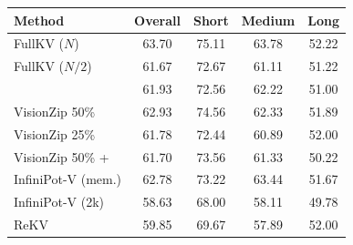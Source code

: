 \begin{tabular}{l|cccc}
\toprule
\textbf{Method} & Overall & Short & Medium & Long \\
\midrule
FullKV ($N$) & 63.70 & 75.11 & 63.78 & 52.22 \\
FullKV ($N/2$) & 61.67 & 72.67 & 61.11 & 51.22 \\
\midrule
\method{} & 61.93 & 72.56 & 62.22 & 51.00 \\
VisionZip 50\% & 62.93 & 74.56 & 62.33 & 51.89 \\
VisionZip 25\% & 61.78 & 72.44 & 60.89 & 52.00 \\
VisionZip 50\% + \method{} & 61.70 & 73.56 & 61.33 & 50.22 \\
InfiniPot-V (mem.) & 62.78 & 73.22 & 63.44 & 51.67 \\
InfiniPot-V (2k) & 58.63 & 68.00 & 58.11 & 49.78 \\
ReKV & 59.85 & 69.67 & 57.89 & 52.00 \\
\bottomrule
\end{tabular}
